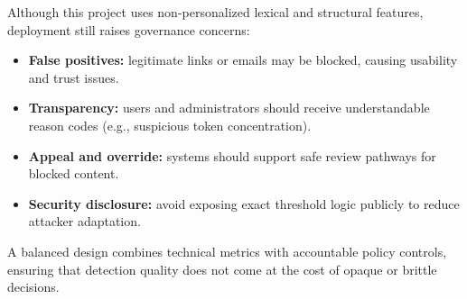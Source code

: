 Although this project uses non-personalized lexical and structural features, deployment still raises governance concerns:
\begin{itemize}
    \item \textbf{False positives:} legitimate links or emails may be blocked, causing usability and trust issues.
    \item \textbf{Transparency:} users and administrators should receive understandable reason codes (e.g., suspicious token concentration).
    \item \textbf{Appeal and override:} systems should support safe review pathways for blocked content.
    \item \textbf{Security disclosure:} avoid exposing exact threshold logic publicly to reduce attacker adaptation.
\end{itemize}

A balanced design combines technical metrics with accountable policy controls, ensuring that detection quality does not come at the cost of opaque or brittle decisions.
